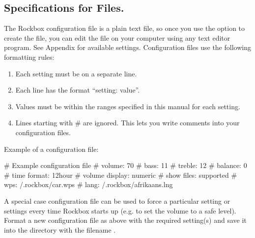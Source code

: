 \subsection{\label{ref:cfg_specs}Specifications for 
  Files.}

The Rockbox configuration file is a plain text file, so once you use the 
 option to create the file, you can edit the file on 
your computer using any text editor program. See
Appendix  for available settings. Configuration 
files use the following formatting rules: %

\begin{enumerate} 
\item Each setting must be on a separate line. 
\item Each line has the format ``setting: value''. 
\item Values must be within the ranges specified in this manual for each 
  setting. 
\item Lines starting with \# are ignored. This lets you write comments into 
  your configuration files. 
\end{enumerate}

Example of a configuration file:
\begin{example}
  # Example configuration file
  # volume: 70
  # bass: 11
  # treble: 12
  # balance: 0
  # time format: 12hour
  # volume display: numeric
  # show files: supported
  # wps: /.rockbox/car.wps
  # lang: /.rockbox/afrikaans.lng
\end{example}

	
	A special case configuration file can be used to force a particular setting or settings every time Rockbox starts up (e.g. to set the volume to a safe level).
Format a new configuration file as above with the required setting(s) and save it into the  directory with the filename .

